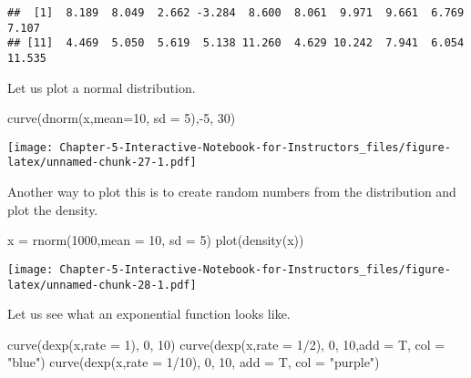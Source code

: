 \documentclass[
]{article}
\newenvironment{Shaded}{\begin{snugshade}}{\end{snugshade}}
\newcommand{\AttributeTok}[1]{\textcolor[rgb]{0.77,0.63,0.00}{#1}}
\newcommand{\DecValTok}[1]{\textcolor[rgb]{0.00,0.00,0.81}{#1}}
\newcommand{\FunctionTok}[1]{\textcolor[rgb]{0.00,0.00,0.00}{#1}}
\newcommand{\NormalTok}[1]{#1}
\newcommand{\OtherTok}[1]{\textcolor[rgb]{0.56,0.35,0.01}{#1}}
\newcommand{\SpecialCharTok}[1]{\textcolor[rgb]{0.00,0.00,0.00}{#1}}
\newcommand{\StringTok}[1]{\textcolor[rgb]{0.31,0.60,0.02}{#1}}
\begin{document}
\begin{verbatim}
##  [1]  8.189  8.049  2.662 -3.284  8.600  8.061  9.971  9.661  6.769  7.107
## [11]  4.469  5.050  5.619  5.138 11.260  4.629 10.242  7.941  6.054 11.535
\end{verbatim}

Let us plot a normal distribution.

\begin{Shaded}
\begin{Highlighting}[]
\FunctionTok{curve}\NormalTok{(}\FunctionTok{dnorm}\NormalTok{(x,}\AttributeTok{mean=}\DecValTok{10}\NormalTok{, }\AttributeTok{sd =} \DecValTok{5}\NormalTok{),}\SpecialCharTok{{-}}\DecValTok{5}\NormalTok{, }\DecValTok{30}\NormalTok{)}
\end{Highlighting}
\end{Shaded}

\texttt{[image: Chapter-5-Interactive-Notebook-for-Instructors\_files/figure-latex/unnamed-chunk-27-1.pdf]}

Another way to plot this is to create random numbers from the
distribution and plot the density.

\begin{Shaded}
\begin{Highlighting}[]
\NormalTok{x }\OtherTok{=} \FunctionTok{rnorm}\NormalTok{(}\DecValTok{1000}\NormalTok{,}\AttributeTok{mean =} \DecValTok{10}\NormalTok{, }\AttributeTok{sd =} \DecValTok{5}\NormalTok{)}
\FunctionTok{plot}\NormalTok{(}\FunctionTok{density}\NormalTok{(x))}
\end{Highlighting}
\end{Shaded}

\texttt{[image: Chapter-5-Interactive-Notebook-for-Instructors\_files/figure-latex/unnamed-chunk-28-1.pdf]}

Let us see what an exponential function looks like.

\begin{Shaded}
\begin{Highlighting}[]
\FunctionTok{curve}\NormalTok{(}\FunctionTok{dexp}\NormalTok{(x,}\AttributeTok{rate =} \DecValTok{1}\NormalTok{), }\DecValTok{0}\NormalTok{, }\DecValTok{10}\NormalTok{)}
\FunctionTok{curve}\NormalTok{(}\FunctionTok{dexp}\NormalTok{(x,}\AttributeTok{rate =} \DecValTok{1}\SpecialCharTok{/}\DecValTok{2}\NormalTok{), }\DecValTok{0}\NormalTok{, }\DecValTok{10}\NormalTok{,}\AttributeTok{add =}\NormalTok{ T, }\AttributeTok{col =} \StringTok{"blue"}\NormalTok{)}
\FunctionTok{curve}\NormalTok{(}\FunctionTok{dexp}\NormalTok{(x,}\AttributeTok{rate =} \DecValTok{1}\SpecialCharTok{/}\DecValTok{10}\NormalTok{), }\DecValTok{0}\NormalTok{, }\DecValTok{10}\NormalTok{, }\AttributeTok{add =}\NormalTok{ T, }\AttributeTok{col =} \StringTok{"purple"}\NormalTok{)}
\end{Highlighting}
\end{Shaded}
\end{document}

